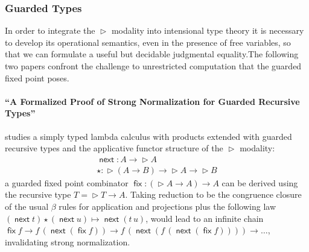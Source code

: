 \documentclass{book}
\DeclareMathOperator{\fix}{\mathsf{fix}}
\newcommand{\red}{\to}
\DeclareMathOperator{\Later}{\vartriangleright}
\DeclareMathOperator{\next}{\ensuremath{\mathsf{next}}}
\begin{document}




\subsubsection{Guarded Types}

In order to integrate the $\Later$ modality into intensional type
theory it is necessary to develop its operational semantics, even in
the presence of free variables, so that we can formulate a useful but
decidable judgmental equality.The following two papers confront the
challenge to unrestricted computation that the guarded fixed point
poses.

  \paragraph{``A Formalized Proof of Strong Normalization for Guarded Recursive Types''}
  studies a simply typed lambda calculus with products extended with guarded
  recursive types and the applicative functor structure of the $\Later$
  modality:
  \[
  \begin{array}{l}
  \next : A \to \Later A \\
  \star : \Later (A \to B) \to \Later A \to \Later B
  \end{array}
  \]
  a guarded fixed point combinator $\fix : (\Later A \to A) \to
  A$ can be derived using the recursive type $T = \Later T \to A$.
  Taking reduction to be the congruence closure of the usual $\beta$ rules
  for application and projections plus the following law $(\next t)
  \star (\next u) \mapsto \next (t\,u)$, would lead to an infinite
  chain $\fix f \red f\,(\next (\fix f)) \red f\,(\next (f\,(\next (\fix f)))) \red
  \ldots$, invalidating strong normalization.
\end{document}
